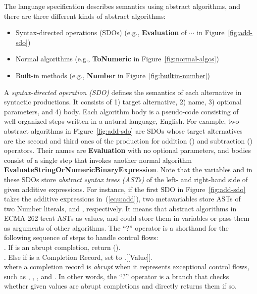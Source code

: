 The language specification describes semantics using abstract algorithms, and
there are three different kinds of abstract algorithms:
%
\begin{itemize}
  \item Syntax-directed operations (SDOs) (e.g., \textbf{Evaluation} of
     \est{:} $\cdots$ in Figure~\ref{fig:add-sdo})

  \item Normal algorithms (e.g., \textbf{ToNumeric} in
    Figure~\ref{fig:normal-algos})

  \item Built-in methods (e.g., \textbf{Number} in
    Figure~\ref{fig:builtin-number})
\end{itemize}


A \textit{syntax-directed operation (SDO)} defines the semantics of each
alternative in syntactic productions.
%
It consists of 1) target alternative, 2) name, 3) optional parameters, and 4)
body.
%
Each algorithm body is a pseudo-code consisting of well-organized steps written
in a natural language, English.
%
For example, two abstract algorithms in Figure~\ref{fig:add-sdo} are SDOs whose
target alternatives are the second and third ones of the
 production for addition (\scode{+}) and subtraction
(\scode{-}) operators.
%
Their names are \textbf{Evaluation} with no optional parameters, and
bodies consist of a single step that invokes another normal algorithm
\textbf{EvaluateStringOrNumericBinaryExpression}.
%
Note that the variables  and
 in these SDOs store \textit{abstract syntax
trees (ASTs)} of the left- and right-hand side of given additive expressions.
%
For instance, if the first SDO in Figure~\ref{fig:add-sdo} takes the additive
expressions in~(\ref{equ:add}), two metavariables store ASTs of two Number
literals,  and , respectively.
%
It means that abstract algorithms in ECMA-262 treat ASTs as values, and could
store them in variables or pass them as arguments of other algorithms.
%
The ``?'' operator is a shorthand for the following sequence of steps to handle
control flows:
\vspace*{.5em}\\
{
  \noindent
  \null{}. If  is an abrupt completion, return
  ().
  \\
  \null{}. Else if  is a Completion Record, set
   to .[[Value]].
}
\vspace*{.5em}\\
where a completion record is \textit{abrupt} when it represents exceptional
control flows, such as , , , and
.
%
In other words, the ``?'' operator is a branch that checks whether given
values are abrupt completions and directly returns them if so.

